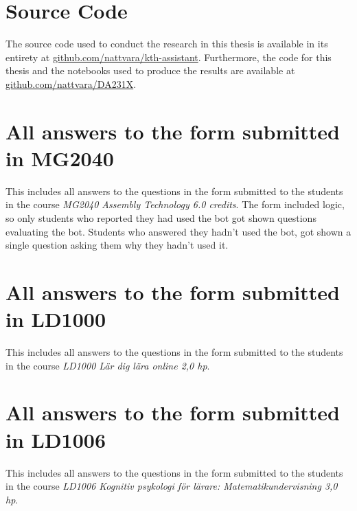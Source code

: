 ﻿\chapter{Source Code}
\label{appendix:source_code}


The source code used to conduct the research in this thesis is available in its entirety at \href{https://github.com/nattvara/kth-assistant}{github.com/nattvara/kth-assistant}. Furthermore, the code for this thesis and the notebooks used to produce the results are available at \href{https://github.com/nattvara/DA231X}{github.com/nattvara/DA231X}.


\chapter{All answers to the form submitted in MG2040}
\label{appendix:mg2040_form}


This includes all answers to the questions in the form submitted to the students in the course \textit{MG2040 Assembly Technology 6.0 credits}. The form included logic, so only students who reported they had used the bot got shown questions evaluating the bot. Students who answered they hadn’t used the bot, got shown a single question asking them why they hadn’t used it.





\chapter{All answers to the form submitted in LD1000}
\label{appendix:ld1000_form}


This includes all answers to the questions in the form submitted to the students in the course \textit{LD1000 Lär dig lära online 2,0 hp}.





\chapter{All answers to the form submitted in LD1006}
\label{appendix:ld1006_form}


This includes all answers to the questions in the form submitted to the students in the course \textit{LD1006 Kognitiv psykologi för lärare: Matematikundervisning 3,0 hp}.





\cleardoublepage